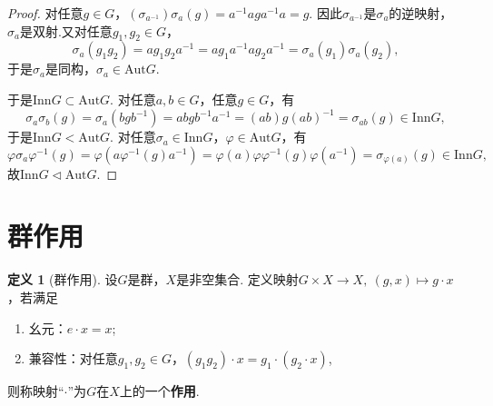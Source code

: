 \documentclass[12pt]{ctexart}
\theoremstyle{definition}
\newtheorem{definition}{定义}[section]
\theoremstyle{plain}
\newcommand{\Aut}{\mathrm{Aut}}
\newcommand{\Inn}{\mathrm{Inn}}
\begin{document}
\begin{proof}
	对任意$g\in G$，$(\sigma_{a^{-1}})\sigma_a(g)=a^{-1}aga^{-1}a=g$. 因此$\sigma_{a^{-1}}$是$\sigma_a$的逆映射，$\sigma_a$是双射.又对任意$g_1,g_2\in G$，
	$$\sigma_a(g_1g_2)=ag_1g_2a^{-1}=ag_1a^{-1}ag_2a^{-1}=\sigma_a(g_1)\sigma_a(g_2),$$
	于是$\sigma_a$是同构，$\sigma_a\in\Aut G$.
	
	于是$\Inn G\subset\Aut G$. 对任意$a,b\in G$，任意$g\in G$，有
	$$\sigma_a\sigma_b(g)=\sigma_a(bgb^{-1})=abgb^{-1}a^{-1}=(ab)g(ab)^{-1}=\sigma_{ab}(g)\in\Inn G,$$
	于是$\Inn G<\Aut G$. 对任意$\sigma_a\in\Inn G$，$\varphi\in\Aut G$，有
	$$\varphi\sigma_a\varphi^{-1}(g)=\varphi(a\varphi^{-1}(g)a^{-1})=\varphi(a)\varphi\varphi^{-1}(g)\varphi(a^{-1})=\sigma_{\varphi(a)}(g)\in\Inn G,$$
	故$\Inn G\lhd\Aut G$.
\end{proof}
\section{群作用}
\begin{definition}[群作用]
	设$G$是群，$X$是非空集合. 定义映射$G\times X\to X,\ (g,x)\mapsto g\cdot x$，若满足
	\begin{enumerate}
		\item 幺元：$e\cdot x=x$;
		\item 兼容性：对任意$g_1,g_2\in G$，$(g_1g_2)\cdot x=g_1\cdot(g_2\cdot x)$,
	\end{enumerate}
	则称映射“$\cdot$”为$G$在$X$上的一个\textbf{作用}.
\end{definition}
\end{document}
